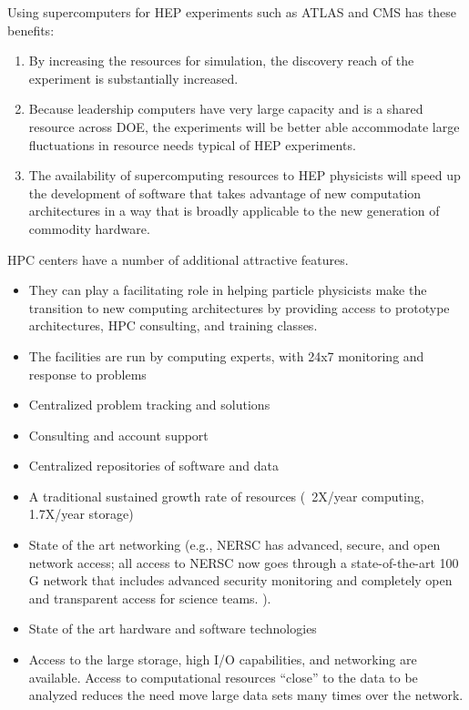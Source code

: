 Using supercomputers for HEP experiments such as ATLAS and CMS has these benefits:
\begin{enumerate} 
\item{By increasing the resources for simulation, the discovery reach of the experiment is substantially increased.}
\item{Because leadership computers have very large capacity and is a shared resource across DOE, the experiments will be better able accommodate large fluctuations in resource needs typical of HEP experiments.}
\item{The availability of supercomputing resources to HEP physicists will speed up the development of software that takes advantage of new computation architectures in a way that is broadly applicable to the new generation of commodity hardware.}
\end{enumerate}
 
HPC centers have a number of additional attractive features.

\begin{itemize} 
\item{They can play a facilitating role in helping particle physicists make the transition to new computing architectures by providing access to prototype architectures, HPC consulting, and training classes.}
\item{The facilities are run by computing experts, with 24x7 monitoring and response to problems}
\item{Centralized problem tracking and solutions}
\item{Consulting and account support}
\item{Centralized repositories of software and data}
\item{A traditional sustained growth rate of resources (~2X/year computing, 1.7X/year storage)}
\item{State of the art networking (e.g., NERSC has advanced, secure, and open network access; all access to NERSC now goes through a state-of-the-art 100 G network that includes advanced security monitoring and completely open and transparent access for science teams. ).}
\item{State of the art hardware and software technologies}
\item{Access to the large storage, high I/O capabilities, and networking are available.  Access to computational resources ``close'' to the data to be analyzed reduces the need move large data sets many times over the network.}
\end{itemize} 

